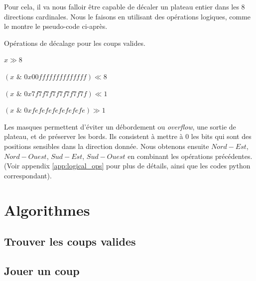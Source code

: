 Pour cela, il va nous falloir être capable de décaler un plateau entier dans les 8 directions cardinales. Nous le faisons en utilisant des opérations logiques, comme le montre le pseudo-code ci-après.
\begin{algorithm}
    \caption{Opérations de décalage pour les coups valides.}
    \begin{algorithmic}[1]
        \State \Return $x \gg 8$
    \EndFunction
    
        \State \Return $(x \,\, \& \,\, 0x00ffffffffffffff) \ll 8$
    \EndFunction
    
        \State \Return $(x \,\, \& \,\, 0x7f7f7f7f7f7f7f7f) \ll 1$
    \EndFunction
    
        \State \Return $(x \,\, \& \,\, 0xfefefefefefefefe) \gg 1$
    \EndFunction
    \end{algorithmic}
    \label{alg:shift_ops}
\end{algorithm}

Les masques permettent d'éviter un débordement ou \textit{overflow}, une sortie de plateau, et de préserver les bords. Ils consistent à mettre à 0 les bits qui sont des positions sensibles dans la direction donnée. Nous obtenons ensuite $Nord-Est$, $Nord-Ouest$, $Sud-Est$, $Sud-Ouest$ en combinant les opérations précédentes. (Voir appendix \ref{app:logical_ops} pour plus de détails, ainsi que les codes python correspondant).



\section{Algorithmes}
\label{sec:algo}

\subsection{Trouver les coups valides}
\label{subsec:valid_moves}

\subsection{Jouer un coup}
\label{subsec:play}

